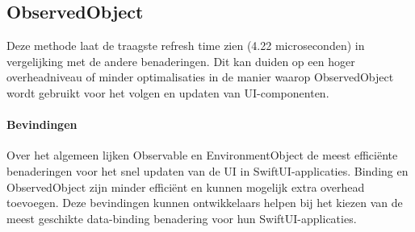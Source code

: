 \subsection{ObservedObject}
Deze methode laat de traagste refresh time zien (4.22 microseconden) in vergelijking met de andere benaderingen. Dit kan duiden op een hoger overheadniveau of minder optimalisaties in de manier waarop ObservedObject wordt gebruikt voor het volgen en updaten van UI-componenten.

\paragraph{Bevindingen}
Over het algemeen lijken Observable en EnvironmentObject de meest efficiënte benaderingen voor het snel updaten van de UI in SwiftUI-applicaties. Binding en ObservedObject zijn minder efficiënt en kunnen mogelijk extra overhead toevoegen. Deze bevindingen kunnen ontwikkelaars helpen bij het kiezen van de meest geschikte data-binding benadering voor hun SwiftUI-applicaties.



